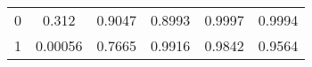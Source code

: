 \documentclass[]{article}
\begin{document}
\begin{longtable}[c]{@{}cccccc@{}}
\midrule
\endhead
\begin{minipage}[t]{0.08\columnwidth}\centering\strut
0
\strut\end{minipage} &
\begin{minipage}[t]{0.14\columnwidth}\centering\strut
0.312
\strut\end{minipage} &
\begin{minipage}[t]{0.14\columnwidth}\centering\strut
0.9047
\strut\end{minipage} &
\begin{minipage}[t]{0.14\columnwidth}\centering\strut
0.8993
\strut\end{minipage} &
\begin{minipage}[t]{0.14\columnwidth}\centering\strut
0.9997
\strut\end{minipage} &
\begin{minipage}[t]{0.14\columnwidth}\centering\strut
0.9994
\strut\end{minipage}\tabularnewline
\begin{minipage}[t]{0.08\columnwidth}\centering\strut
1
\strut\end{minipage} &
\begin{minipage}[t]{0.14\columnwidth}\centering\strut
0.00056
\strut\end{minipage} &
\begin{minipage}[t]{0.14\columnwidth}\centering\strut
0.7665
\strut\end{minipage} &
\begin{minipage}[t]{0.14\columnwidth}\centering\strut
0.9916
\strut\end{minipage} &
\begin{minipage}[t]{0.14\columnwidth}\centering\strut
0.9842
\strut\end{minipage} &
\begin{minipage}[t]{0.14\columnwidth}\centering\strut
0.9564
\strut\end{minipage}\tabularnewline
\bottomrule
\end{longtable}
\end{document}
